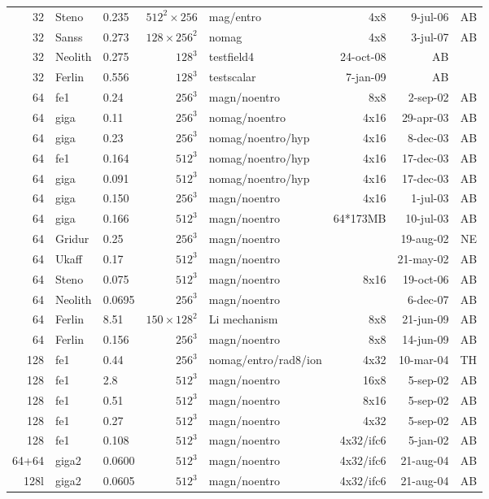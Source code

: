 \documentclass[\mydriver,12pt,twoside,notitlepage,a4paper]{article}
\begin{document}
\begin{center}
\begin{small}
\begin{longtable}{rllrlrrr}
  32 & Steno & 0.235& $512^2\times256$ &mag/entro& 4x8 &  9-jul-06 & AB \\
  32 & Sanss & 0.273& $128\times256^2$ &nomag& 4x8 &  3-jul-07 & AB \\
  32 &Neolith& 0.275& $128^3$ &testfield4& 24-oct-08 & AB \\
  32 &Ferlin & 0.556& $128^3$ &testscalar&  7-jan-09 & AB \\
  64 & fe1   & 0.24 & $256^3$ & magn/noentro &  8x8   &  2-sep-02 & AB \\
  64 & giga  & 0.11 & $256^3$ &nomag/noentro&  4x16  & 29-apr-03 & AB \\
  64 & giga  & 0.23 & $256^3$ &nomag/noentro/hyp&4x16& 8-dec-03& AB \\
  64 & fe1   & 0.164& $512^3$ &nomag/noentro/hyp&4x16&17-dec-03& AB \\
  64 & giga  & 0.091& $512^3$ &nomag/noentro/hyp&4x16&17-dec-03& AB \\
  64 & giga  & 0.150& $256^3$ & magn/noentro &  4x16  &  1-jul-03 & AB \\
  64 & giga  & 0.166& $512^3$ & magn/noentro &64*173MB& 10-jul-03 & AB \\
  64 & Gridur& 0.25 & $256^3$ & magn/noentro &        & 19-aug-02 & NE \\
  64 & Ukaff & 0.17 & $512^3$ & magn/noentro &        & 21-may-02 & AB \\
  64 & Steno & 0.075& $512^3$ & magn/noentro &  8x16  & 19-oct-06 & AB \\
  64 &Neolith&0.0695& $256^3$ & magn/noentro &        &  6-dec-07 & AB \\
  64 &Ferlin & 8.51&$150\times128^2$&Li mechanism& 8x8& 21-jun-09 & AB \\
  64 &Ferlin & 0.156& $256^3$ & magn/noentro &  8x8   & 14-jun-09 & AB \\
 128 & fe1   & 0.44 & $256^3$ &nomag/entro/rad8/ion&4x32&10-mar-04& TH \\
 128 & fe1   & 2.8  & $512^3$ & magn/noentro & 16x8   &  5-sep-02 & AB \\
 128 & fe1   & 0.51 & $512^3$ & magn/noentro & 8x16   &  5-sep-02 & AB \\
 128 & fe1   & 0.27 & $512^3$ & magn/noentro & 4x32   &  5-sep-02 & AB \\
 128 & fe1   & 0.108& $512^3$ & magn/noentro &4x32/ifc6& 5-jan-02 & AB \\
64+64& giga2 & 0.0600&$512^3$ & magn/noentro &4x32/ifc6&21-aug-04 & AB \\
 128l& giga2 & 0.0605&$512^3$ & magn/noentro &4x32/ifc6&21-aug-04 & AB \\

\end{longtable}
\end{small}
\end{center}
\end{document}
